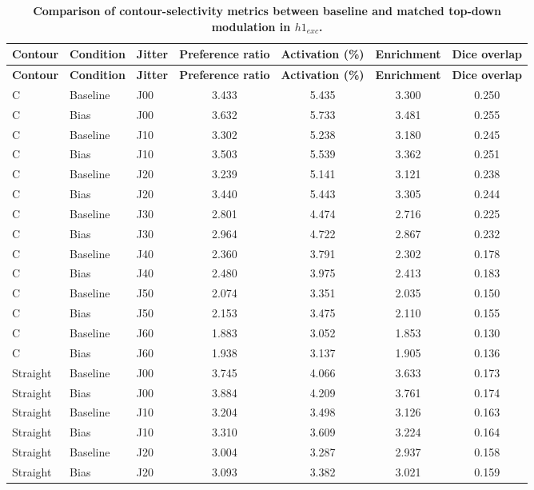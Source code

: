 \begin{longtable}{lllcccc}
\caption{\textbf{Comparison of contour-selectivity metrics between baseline and matched top-down modulation in $h1_{exc}$.}}
\label{tab:baseline_bias_metrics}\\
\toprule
\textbf{Contour} & \textbf{Condition} & \textbf{Jitter} & \textbf{Preference ratio} & \textbf{Activation (\%)} & \textbf{Enrichment} & \textbf{Dice overlap} \\
\midrule
\endfirsthead
\toprule
\textbf{Contour} & \textbf{Condition} & \textbf{Jitter} & \textbf{Preference ratio} & \textbf{Activation (\%)} & \textbf{Enrichment} & \textbf{Dice overlap} \\
\midrule
\endhead
C & Baseline & J00 & 3.433 & 5.435 & 3.300 & 0.250 \\
C & Bias & J00 & 3.632 & 5.733 & 3.481 & 0.255 \\
C & Baseline & J10 & 3.302 & 5.238 & 3.180 & 0.245 \\
C & Bias & J10 & 3.503 & 5.539 & 3.362 & 0.251 \\
C & Baseline & J20 & 3.239 & 5.141 & 3.121 & 0.238 \\
C & Bias & J20 & 3.440 & 5.443 & 3.305 & 0.244 \\
C & Baseline & J30 & 2.801 & 4.474 & 2.716 & 0.225 \\
C & Bias & J30 & 2.964 & 4.722 & 2.867 & 0.232 \\
C & Baseline & J40 & 2.360 & 3.791 & 2.302 & 0.178 \\
C & Bias & J40 & 2.480 & 3.975 & 2.413 & 0.183 \\
C & Baseline & J50 & 2.074 & 3.351 & 2.035 & 0.150 \\
C & Bias & J50 & 2.153 & 3.475 & 2.110 & 0.155 \\
C & Baseline & J60 & 1.883 & 3.052 & 1.853 & 0.130 \\
C & Bias & J60 & 1.938 & 3.137 & 1.905 & 0.136 \\
\midrule
Straight & Baseline & J00 & 3.745 & 4.066 & 3.633 & 0.173 \\
Straight & Bias & J00 & 3.884 & 4.209 & 3.761 & 0.174 \\
Straight & Baseline & J10 & 3.204 & 3.498 & 3.126 & 0.163 \\
Straight & Bias & J10 & 3.310 & 3.609 & 3.224 & 0.164 \\
Straight & Baseline & J20 & 3.004 & 3.287 & 2.937 & 0.158 \\
Straight & Bias & J20 & 3.093 & 3.382 & 3.021 & 0.159 \\

\end{longtable}
